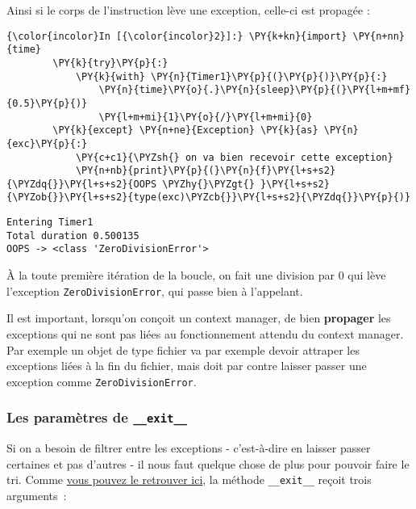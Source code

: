     Ainsi si le corps de l'instruction lève une exception, celle-ci est
propagée :

    \begin{Verbatim}[commandchars=\\\{\},frame=single,framerule=0.3mm,rulecolor=\color{cellframecolor}]
{\color{incolor}In [{\color{incolor}2}]:} \PY{k+kn}{import} \PY{n+nn}{time}
        \PY{k}{try}\PY{p}{:}
            \PY{k}{with} \PY{n}{Timer1}\PY{p}{(}\PY{p}{)}\PY{p}{:}
                \PY{n}{time}\PY{o}{.}\PY{n}{sleep}\PY{p}{(}\PY{l+m+mf}{0.5}\PY{p}{)}
                \PY{l+m+mi}{1}\PY{o}{/}\PY{l+m+mi}{0}
        \PY{k}{except} \PY{n+ne}{Exception} \PY{k}{as} \PY{n}{exc}\PY{p}{:}
            \PY{c+c1}{\PYZsh{} on va bien recevoir cette exception}
            \PY{n+nb}{print}\PY{p}{(}\PY{n}{f}\PY{l+s+s2}{\PYZdq{}}\PY{l+s+s2}{OOPS \PYZhy{}\PYZgt{} }\PY{l+s+s2}{\PYZob{}}\PY{l+s+s2}{type(exc)\PYZcb{}}\PY{l+s+s2}{\PYZdq{}}\PY{p}{)}
\end{Verbatim}


    \begin{Verbatim}[commandchars=\\\{\},frame=single,framerule=0.3mm,rulecolor=\color{cellframecolor}]
Entering Timer1
Total duration 0.500135
OOPS -> <class 'ZeroDivisionError'>
\end{Verbatim}

    À la toute première itération de la boucle, on fait une division par 0
qui lève l'exception \texttt{ZeroDivisionError}, qui passe bien à
l'appelant.

Il est important, lorsqu'on conçoit un context manager, de bien
\textbf{propager} les exceptions qui ne sont pas liées au fonctionnement
attendu du context manager. Par exemple un objet de type fichier va par
exemple devoir attraper les exceptions liées à la fin du fichier, mais
doit par contre laisser passer une exception comme
\texttt{ZeroDivisionError}.

    \hypertarget{les-paramuxe8tres-de-__exit__}{%
\subsubsection{\texorpdfstring{Les paramètres de
\texttt{\_\_exit\_\_}}{Les paramètres de \_\_exit\_\_}}\label{les-paramuxe8tres-de-__exit__}}

    Si on a besoin de filtrer entre les exceptions - c'est-à-dire en laisser
passer certaines et pas d'autres - il nous faut quelque chose de plus
pour pouvoir faire le tri. Comme
\href{https://docs.python.org/3/reference/datamodel.html\#with-statement-context-managers}{vous
pouvez le retrouver ici}, la méthode \texttt{\_\_exit\_\_} reçoit trois
arguments~:


